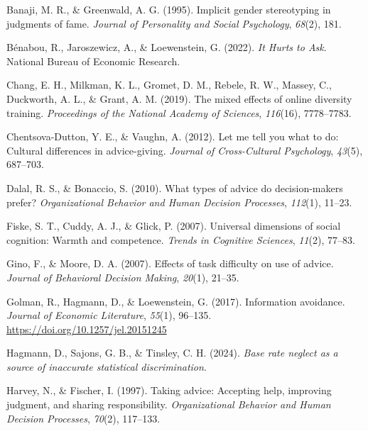 \documentclass[
  man,
  floatsintext,
  longtable,
  nolmodern,
  notxfonts,
  notimes,
  colorlinks=true,linkcolor=blue,citecolor=blue,urlcolor=blue]{apa7}
\newlength{\cslhangindent}
\newenvironment{CSLReferences}[2] %
 {\begin{list}{}{%
  \setlength{\itemindent}{0pt}
  \setlength{\leftmargin}{0pt}
  \setlength{\parsep}{0pt}
  \ifodd #1
   \setlength{\leftmargin}{\cslhangindent}
   \setlength{\itemindent}{-1\cslhangindent}
  \fi
  \setlength{\itemsep}{#2\baselineskip}}}
 {\end{list}}
\begin{document}
\label{refs}
\begin{CSLReferences}{1}{0}
Banaji, M. R., \& Greenwald, A. G. (1995). Implicit gender stereotyping
in judgments of fame. \emph{Journal of Personality and Social
Psychology}, \emph{68}(2), 181.

Bénabou, R., Jaroszewicz, A., \& Loewenstein, G. (2022). \emph{It
{Hurts} to {Ask}}. National Bureau of Economic Research.

Chang, E. H., Milkman, K. L., Gromet, D. M., Rebele, R. W., Massey, C.,
Duckworth, A. L., \& Grant, A. M. (2019). The mixed effects of online
diversity training. \emph{Proceedings of the National Academy of
Sciences}, \emph{116}(16), 7778--7783.

Chentsova-Dutton, Y. E., \& Vaughn, A. (2012). Let me tell you what to
do: Cultural differences in advice-giving. \emph{Journal of
Cross-Cultural Psychology}, \emph{43}(5), 687--703.

Dalal, R. S., \& Bonaccio, S. (2010). What types of advice do
decision-makers prefer? \emph{Organizational Behavior and Human Decision
Processes}, \emph{112}(1), 11--23.

Fiske, S. T., Cuddy, A. J., \& Glick, P. (2007). Universal dimensions of
social cognition: Warmth and competence. \emph{Trends in Cognitive
Sciences}, \emph{11}(2), 77--83.

Gino, F., \& Moore, D. A. (2007). Effects of task difficulty on use of
advice. \emph{Journal of Behavioral Decision Making}, \emph{20}(1),
21--35.

Golman, R., Hagmann, D., \& Loewenstein, G. (2017). Information
avoidance. \emph{Journal of Economic Literature}, \emph{55}(1), 96--135.
\url{https://doi.org/10.1257/jel.20151245}

Hagmann, D., Sajons, G. B., \& Tinsley, C. H. (2024). \emph{Base rate
neglect as a source of inaccurate statistical discrimination}.

Harvey, N., \& Fischer, I. (1997). Taking advice: {Accepting} help,
improving judgment, and sharing responsibility. \emph{Organizational
Behavior and Human Decision Processes}, \emph{70}(2), 117--133.


\end{CSLReferences}
\end{document}
